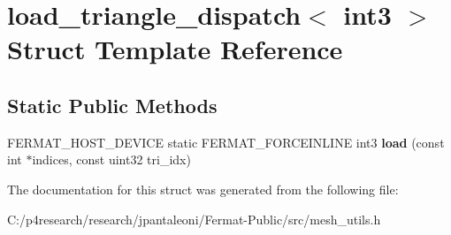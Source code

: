 \hypertarget{structload__triangle__dispatch_3_01int3_01_4}{}\section{load\+\_\+triangle\+\_\+dispatch$<$ int3 $>$ Struct Template Reference}
\label{structload__triangle__dispatch_3_01int3_01_4}
\subsection*{Static Public Methods}
\begin{DoxyCompactItemize}
\item 
\mbox{\label{structload__triangle__dispatch_3_01int3_01_4_a12eff35cb126e04e261aa5a31a847580}} 
F\+E\+R\+M\+A\+T\+\_\+\+H\+O\+S\+T\+\_\+\+D\+E\+V\+I\+CE static F\+E\+R\+M\+A\+T\+\_\+\+F\+O\+R\+C\+E\+I\+N\+L\+I\+NE int3 {\bfseries load} (const int $\ast$indices, const uint32 tri\+\_\+idx)
\end{DoxyCompactItemize}


The documentation for this struct was generated from the following file\+:\begin{DoxyCompactItemize}
\item 
C\+:/p4research/research/jpantaleoni/\+Fermat-\/\+Public/src/mesh\+\_\+utils.\+h\end{DoxyCompactItemize}
